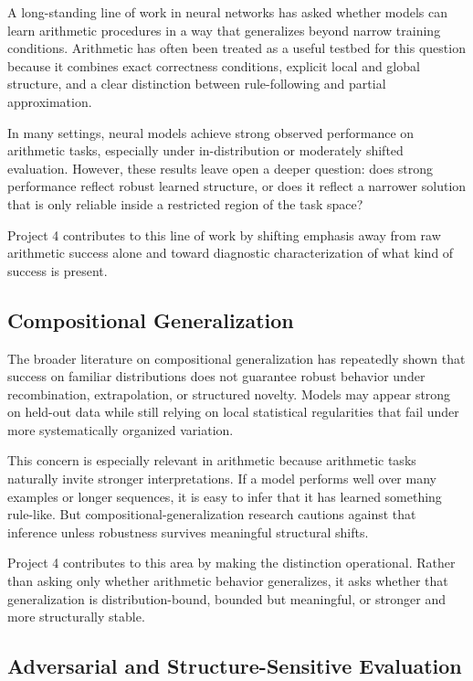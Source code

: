\documentclass[11pt]{article}
\begin{document}
A long-standing line of work in neural networks has asked whether models can learn arithmetic procedures in a way that generalizes beyond narrow training conditions. Arithmetic has often been treated as a useful testbed for this question because it combines exact correctness conditions, explicit local and global structure, and a clear distinction between rule-following and partial approximation.

In many settings, neural models achieve strong observed performance on arithmetic tasks, especially under in-distribution or moderately shifted evaluation. However, these results leave open a deeper question: does strong performance reflect robust learned structure, or does it reflect a narrower solution that is only reliable inside a restricted region of the task space?

Project 4 contributes to this line of work by shifting emphasis away from raw arithmetic success alone and toward diagnostic characterization of what kind of success is present.

\subsection{Compositional Generalization}

The broader literature on compositional generalization has repeatedly shown that success on familiar distributions does not guarantee robust behavior under recombination, extrapolation, or structured novelty. Models may appear strong on held-out data while still relying on local statistical regularities that fail under more systematically organized variation.

This concern is especially relevant in arithmetic because arithmetic tasks naturally invite stronger interpretations. If a model performs well over many examples or longer sequences, it is easy to infer that it has learned something rule-like. But compositional-generalization research cautions against that inference unless robustness survives meaningful structural shifts.

Project 4 contributes to this area by making the distinction operational. Rather than asking only whether arithmetic behavior generalizes, it asks whether that generalization is distribution-bound, bounded but meaningful, or stronger and more structurally stable.

\subsection{Adversarial and Structure-Sensitive Evaluation}
\end{document}
